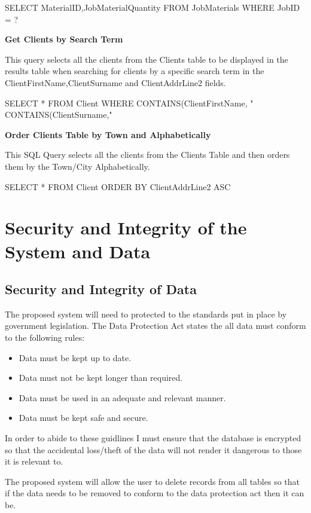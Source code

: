 \begin{sql}
SELECT MaterialID,JobMaterialQuantity FROM JobMaterials WHERE JobID = ? 
\end{sql}


\textbf{Get Clients by Search Term}
\begin{flushleft}
This query selects all the clients from the Clients table to be displayed in the results table when searching for clients by a specific search term in the ClientFirstName,ClientSurname and ClientAddrLine2 fields.
\begin{sql}
SELECT * FROM Client WHERE CONTAINS(ClientFirstName, "%
CONTAINS(ClientSurname,"%
\end{sql}
\end{flushleft}

\textbf{Order Clients Table by Town and Alphabetically}
\begin{flushleft}
This SQL Query selects all the clients from the Clients Table and then orders them by the Town/City Alphabetically.
\begin{sql}
SELECT * FROM Client ORDER BY ClientAddrLine2 ASC    
\end{sql}
\end{flushleft}

\section{Security and Integrity of the System and Data}

\subsection{Security and Integrity of Data}

\begin{flushleft}

The proposed system will need to protected to the standards put in place by government legislation. The Data Protection Act states the all data must conform to the following rules:

\begin{itemize}
\item Data must be kept up to date.
\item Data must not be kept longer than required.
\item Data must be used in an adequate and relevant manner.
\item Data must be kept safe and secure.
\end{itemize}

In order to abide to these guidlines I must ensure that the database is encrypted so that the accidental loss/theft of the data will not render it dangerous to those it is relevant to.

The proposed system will allow the user to delete records from all tables so that if the data needs to be removed to conform to the data protection act then it can be.

\end{flushleft}
